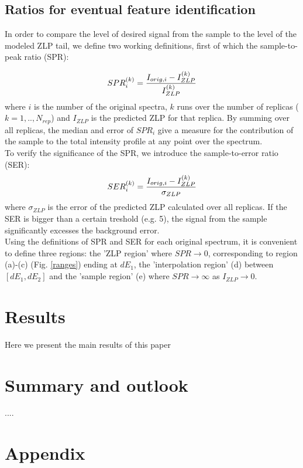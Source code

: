 \documentclass[11pt,a4paper]{article}
\def\frac#1#2{{{#1}\over {#2}}}
\numberwithin{equation}{section}
\numberwithin{figure}{section}
\numberwithin{table}{section}
\begin{document}
\subsection{Ratios for eventual feature identification}

In order to compare the level of desired signal from the sample to the level of the modeled ZLP tail, we define two working definitions, first of which the sample-to-peak ratio (SPR):

\begin{equation}
    SPR_{i}^{(k)} = \frac{I_{orig, i} - I_{ZLP}^{(k)}}{I_{ZLP}^{(k)}}
\end{equation}
where $i$ is the number of the original spectra, $k$ runs over the number of replicas ($k=1,..,N_{rep}$) and $I_{ZLP}$ is the predicted ZLP for that replica. By summing over all replicas, the median and error of $SPR_i$ give a measure for the contribution of the sample to the total intensity profile at any point over the spectrum. \\

To verify the significance of the SPR, we introduce the sample-to-error ratio (SER):
\begin{equation}
    SER_{i}^{(k)} = \frac{I_{orig, i} - I_{ZLP}^{(k)}}{\sigma_{ZLP}}
\end{equation}
where $\sigma_{ZLP}$ is the error of the predicted ZLP calculated over all replicas. 
If the SER is bigger than a certain treshold (e.g. 5), the signal from the sample significantly excesses the background error. \\
Using the definitions of SPR and SER for each original spectrum, it is convenient to define three regions: the 'ZLP region' where $SPR \rightarrow0$, corresponding to region (a)-(c) (Fig. \ref{ranges}) ending at $dE_1$, the 'interpolation region' (d) between $[dE_1, dE_2]$ and the 'sample region' (e) where $SPR\rightarrow\infty$ as $I_{ZLP}\rightarrow0$.


\section{Results}
Here we present the main results of this paper

\section{Summary and outlook}
....

\section{Appendix}
\end{document}
